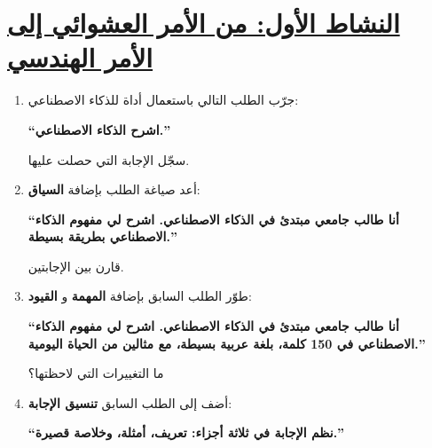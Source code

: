 \documentclass[a4paper]{article}
\begin{document}
\section*{\khatt\underline{النشاط الأول: من الأمر العشوائي إلى الأمر الهندسي}}

\begin{enumerate}


\item جرّب الطلب التالي باستعمال أداة للذكاء الاصطناعي:

\begin{center}

\textbf{
``اشرح الذكاء الاصطناعي.''
}

\end{center}

سجّل الإجابة التي حصلت عليها.


\item أعد صياغة الطلب بإضافة \textbf{السياق}:

\begin{center}

\textbf{
``أنا طالب جامعي مبتدئ في الذكاء الاصطناعي.
اشرح لي مفهوم الذكاء الاصطناعي بطريقة بسيطة.''
}

\end{center}

قارن بين الإجابتين.


\item طوّر الطلب السابق بإضافة \textbf{المهمة} و
\textbf{القيود}:

\begin{center}

\textbf{
``أنا طالب جامعي مبتدئ في الذكاء الاصطناعي.
اشرح لي مفهوم الذكاء الاصطناعي في 150 كلمة،
بلغة عربية بسيطة، مع مثالين من الحياة اليومية.''
}

\end{center}

ما التغييرات التي لاحظتها؟


\item أضف إلى الطلب السابق \textbf{تنسيق الإجابة}:

\begin{center}

\textbf{
``نظم الإجابة في ثلاثة أجزاء:
تعريف، أمثلة، وخلاصة قصيرة.''
}


\end{center}
\end{enumerate}
\end{document}
